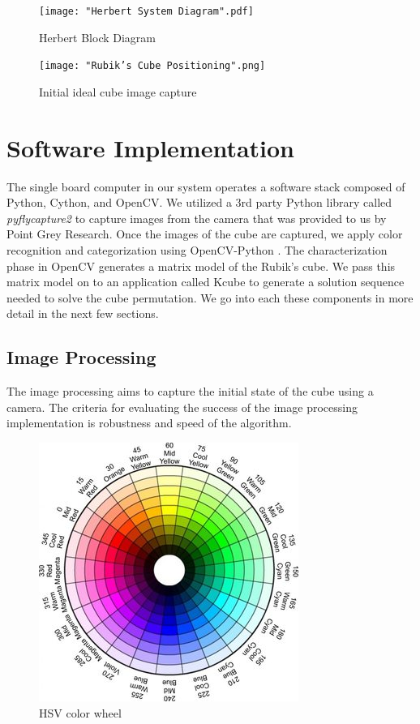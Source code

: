 \documentclass[final, letterpaper, 10 pt, conference, twocolumn]{IEEEtran}
\begin{document}
\begin{figure}[!ht]
\centering
\texttt{[image: "Herbert System Diagram".pdf]}
\caption{Herbert Block Diagram}
\label{fig:System Block Diagram}
\end{figure}

\begin{figure}[!ht]
\centering
\texttt{[image: "Rubik's Cube Positioning".png]}
\caption{Initial ideal cube image capture}
\label{fig:Camera Positioning}
\end{figure}

\section{Software Implementation}
\label{sec:Software Implementation}
The single board computer in our system operates a software stack composed of Python, Cython, and OpenCV. We utilized a 3rd party Python library called \textit{pyflycapture2} \cite{pyflycapture2} to capture images from the camera that was provided to us by Point Grey Research. Once the images of the cube are captured, we apply color recognition and categorization using OpenCV-Python \cite{OpenCVPython}. The characterization phase in OpenCV generates a matrix model of the Rubik's cube. We pass this matrix model on to an application called Kcube to generate a solution sequence needed to solve the cube permutation. We go into each these components in more detail in the next few sections.

\subsection{Image Processing}
The image processing aims to capture the initial state of the cube using a camera. The criteria for evaluating the success of the image processing implementation is robustness and speed of the algorithm.

\begin{figure}[!hb]
\centering
\includegraphics[scale=0.6]{hsv_color.jpg}
\caption{HSV color wheel}
\label{fig:HSV}
\end{figure}
\end{document}
